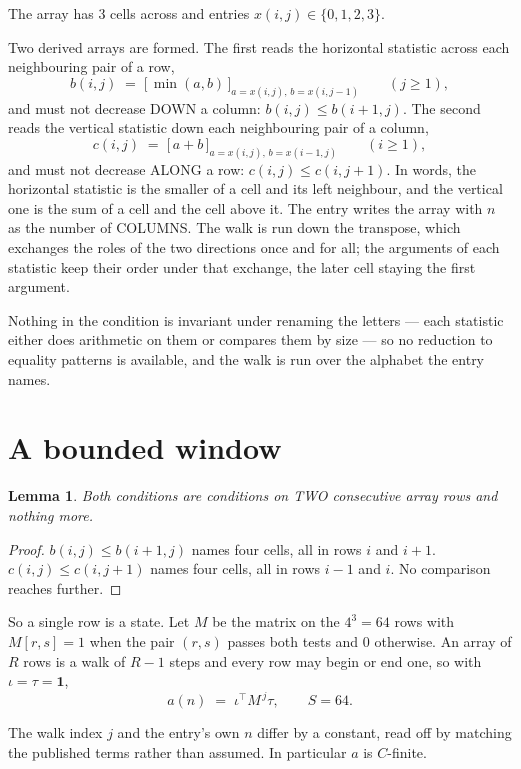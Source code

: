 \documentclass[11pt,a4paper]{article}
\theoremstyle{plain}
\newtheorem{lemma}[theorem]{Lemma}
\theoremstyle{definition}
\begin{document}
The array has $3$ cells across and entries $x(i,j)\in\{0,1,2,3\}$.

Two derived arrays are formed. The first reads the horizontal statistic across each
neighbouring pair of a row,
\[
b(i,j)\;=\;\bigl[\,\min(a,b)\,\bigr]_{a=x(i,j),\,b=x(i,j-1)}\qquad (j\ge1),
\]
and must not decrease DOWN a column: $b(i,j)\le b(i{+}1,j)$. The second reads the vertical
statistic down each neighbouring pair of a column,
\[
c(i,j)\;=\;\bigl[\,a+b\,\bigr]_{a=x(i,j),\,b=x(i{-}1,j)}\qquad (i\ge1),
\]
and must not decrease ALONG a row: $c(i,j)\le c(i,j{+}1)$. In words, the horizontal statistic
is the smaller of a cell and its left neighbour, and the vertical one is
the sum of a cell and the cell above it. The entry writes the array with $n$ as the number of COLUMNS. The walk is run down the transpose, which exchanges the roles of the two directions once and for all; the arguments of each statistic keep their order under that exchange, the later cell staying the first argument.

Nothing in the condition is invariant under renaming the letters --- each statistic either does
arithmetic on them or compares them by size --- so no reduction to equality patterns is
available, and the walk is run over the alphabet the entry names.

\section{A bounded window}

\begin{lemma}\label{lem:win}
Both conditions are conditions on TWO consecutive array rows and nothing more.
\end{lemma}

\begin{proof}
$b(i,j)\le b(i{+}1,j)$ names four cells, all in rows $i$ and $i+1$. $c(i,j)\le c(i,j{+}1)$
names four cells, all in rows $i-1$ and $i$. No comparison reaches further.
\end{proof}

So a single row is a state. Let $M$ be the matrix on the $4^{3}=64$ rows with
$M[r,s]=1$ when the pair $(r,s)$ passes both tests and $0$ otherwise. An array of $R$ rows is a
walk of $R-1$ steps and every row may begin or end one, so with $\iota=\tau=\mathbf{1}$,
\[
a(n)\;=\;\iota^{\!\top}M^{\,j}\tau ,\qquad S=64.
\]

The walk index $j$ and the entry's own $n$ differ by a constant, read off by matching the
published terms rather than assumed. In particular $a$ is $C$-finite.
\end{document}
